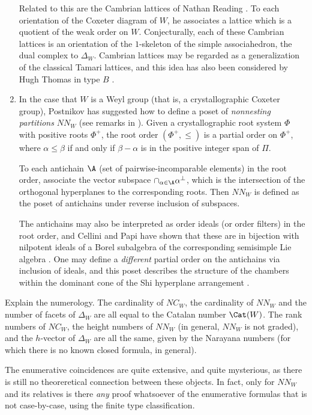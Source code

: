 \begin{enumerate}
Related to this are the Cambrian lattices of Nathan Reading
\cite{reading:cambrian}. To each orientation of the Coxeter diagram of
$W$, he associates a lattice which is a quotient of the weak order on
$W$. Conjecturally, each of these Cambrian lattices is an orientation
of the $1$-skeleton of the simple associahedron, the dual complex
to $\Delta_W$. Cambrian lattices may be regarded as a generalization of
the classical Tamari lattices, and this idea has also been considered
by Hugh Thomas in type $B$ \cite{thomas}.


\item In the case that $W$ is a Weyl group (that is, a crystallographic
Coxeter group), Postnikov has suggested how to define a poset of
\emph{nonnesting partitions} $NN_W$ (see remarks in \cite{reiner}). Given
a crystallographic root system $\Phi$ with positive roots $\Phi^+$,
the root order $(\Phi^+,\leq)$ is a partial order on $\Phi^+$,
where $\alpha\leq\beta$ if and only if $\beta-\alpha$ is in the positive
integer span of $\Pi$.

To each antichain $\A$ (set of pairwise-incomparable elements) in
the root order, associate the vector subspace $\cap_{\alpha\in\A}
\alpha^{\perp}$, which is the intersection of the orthogonal hyperplanes
to the corresponding roots. Then $NN_W$ is defined as the poset of
antichains under reverse inclusion of subspaces.

The antichains may also be interpreted as order ideals (or order
filters) in the root order, and Cellini and Papi have shown that these
are in bijection with nilpotent ideals of a Borel subalgebra of the
corresponding semisimple Lie algebra \cite{cellini-papi}. One may define
a \emph{different} partial order on the antichains via inclusion of ideals,
and this poset describes the structure of the chambers within the dominant
cone of the Shi hyperplane arrangement \cite{shi}.

\end{enumerate}

 \begin{problemblock}

\begin{problem}[1.1]
\label{central:one}
Explain the numerology. The cardinality of $NC_W$, the cardinality of
$NN_W$ and the number of facets of $\Delta_W$ are all equal to the Catalan
number $\Cat(W)$. The rank numbers of $NC_W$, the height numbers of $NN_W$
(in general, $NN_W$ is not graded), and the $h$-vector of $\Delta_W$ are
all the same, given by the Narayana numbers (for which there is no
known closed formula, in general).
\end{problem}

 The enumerative coincidences are quite
extensive, and quite mysterious, as there is  still no theoreretical
connection between these objects.  In fact, only for $NN_W$ and its
relatives is there \emph{any} proof whatsoever of the enumerative formulas
that is not case-by-case, using the finite type classification.
\end{problemblock}

